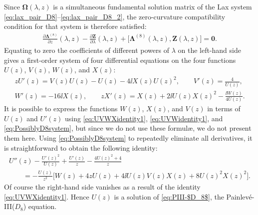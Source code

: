 Since $\mathbf{\Omega}(\lambda,z)$ is a simultaneous fundamental solution matrix of the Lax system \eqref{eq:lax_pair_D8}--\eqref{eq:lax_pair_D8_2}, the zero-curvature compatibility condition for that system is therefore satisfied:
\begin{gather*}
 \frac{\partial\mathbf{\Lambda}^{(8)}}{\partial z}(\lambda,z)-\frac{\partial\mathbf{Z}}{\partial\lambda}(\lambda,z)+\big[\mathbf{\Lambda}^{(8)}(\lambda,z),\mathbf{Z}(\lambda,z)\big]=\mathbf{0}.
\end{gather*}
Equating to zero the coefficients of different powers of $\lambda$ on the left-hand side gives a first-order system of four differential equations on the four functions $U(z)$, $V(z)$, $W(z)$, and $X(z)$:
\begin{gather}
 zU'(z)=V(z)U(z)-U(z)-4\ii X(z)U(z)^2,\qquad
 V'(z)=\frac{4}{U(z)},\nonumber\\
 W'(z)=-16\ii X(z),\qquad
 zX'(z)=X(z)+2\ii U(z)X(z)^2-\frac{\ii W(z)}{4U(z)}.
 \label{eq:PossiblyD8system}
\end{gather}
It is possible to express the functions $W(z)$, $X(z)$, and $V(z)$ in terms of $U(z)$ and $U'(z)$ using \eqref{eq:UVWXidentity1}, \eqref{eq:UVWidentity1}, and \eqref{eq:PossiblyD8system}, but since we do not use these formul\ae, we do not present them here. Using \eqref{eq:PossiblyD8system} to repeatedly eliminate all derivatives, it is straightforward to obtain the following identity:
\begin{gather*}
 U''(z)-\frac{U'(z)^2}{U(z)}+\frac{U'(z)}{z} -\frac{4U(z)^2+4}{z}\\
 \qquad=-\frac{U(z)}{z^2}\big[ W(z)+4 z U(z) +4 \ii U(z) V(z) X(z) + 8 U(z)^2 X(z)^2\big].
\end{gather*}
Of course the right-hand side vanishes as a result of the identity \eqref{eq:UVWXidentity1}. Hence $U(z)$ is a solution of \eqref{eq:PIII-$D_8$}, the Painlev\'e-III($D_8$) equation.

